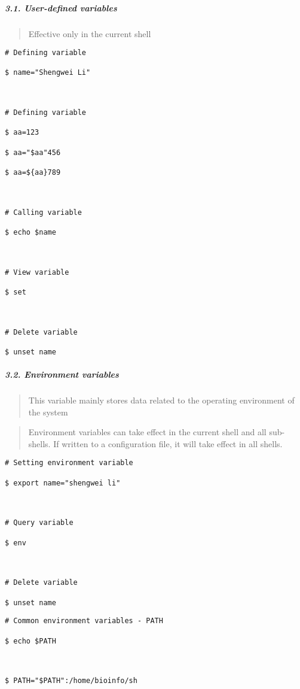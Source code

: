 \documentclass[
]{article}
\begin{document}
\hypertarget{header-n275}{%
\subparagraph{3.1. User-defined variables}\label{header-n275}}

\begin{quote}
Effective only in the current shell
\end{quote}

\begin{verbatim}
# Defining variable

$ name="Shengwei Li"



# Defining variable

$ aa=123

$ aa="$aa"456

$ aa=${aa}789



# Calling variable

$ echo $name



# View variable

$ set



# Delete variable

$ unset name
\end{verbatim}

\hypertarget{header-n311}{%
\subparagraph{3.2. Environment variables}\label{header-n311}}

\begin{quote}
This variable mainly stores data related to the operating environment of
the system
\end{quote}

\begin{quote}
Environment variables can take effect in the current shell and all
sub-shells. If written to a configuration file, it will take effect in
all shells.
\end{quote}

\begin{verbatim}
# Setting environment variable

$ export name="shengwei li"



# Query variable

$ env



# Delete variable

$ unset name
\end{verbatim}

\begin{verbatim}
# Common environment variables - PATH

$ echo $PATH



$ PATH="$PATH":/home/bioinfo/sh
\end{verbatim}
\end{document}
